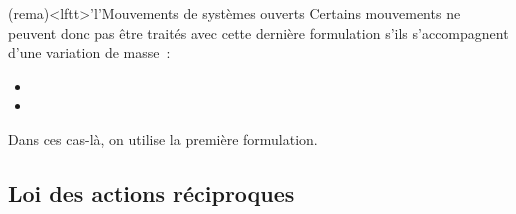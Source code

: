 \documentclass[../../main/main.tex]{subfiles}
\begin{document}
\begin{tcb*}(rema)<lftt>'l'{Mouvements de systèmes ouverts}
	Certains mouvements ne peuvent donc pas être traités avec cette dernière
	formulation s'ils s'accompagnent d'une variation de masse~:
	\begin{itemize}
		\item {}
		\item {}
	\end{itemize}
	Dans ces cas-là, on utilise la première formulation.
\end{tcb*}

\subsection{Loi des actions réciproques}
\end{document}
